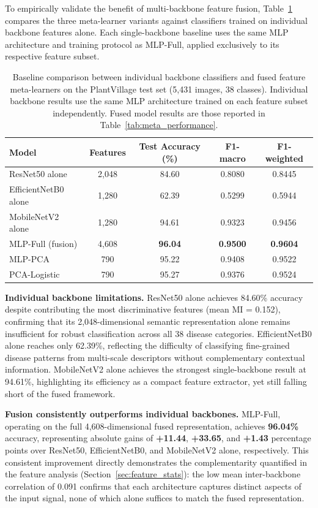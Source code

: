 \documentclass[pdflatex,sn-basic]{sn-jnl}
\begin{document}
To empirically validate the benefit of multi-backbone feature fusion,
Table~\ref{tab:baseline_comparison} compares the three meta-learner variants
against classifiers trained on individual backbone features alone. Each
single-backbone baseline uses the same MLP architecture and training protocol
as MLP-Full, applied exclusively to its respective feature subset.
\begin{table}[htbp]
\caption{Baseline comparison between individual backbone classifiers and 
fused feature meta-learners on the PlantVillage test set (5,431 images, 
38 classes). Individual backbone results use the same MLP architecture 
trained on each feature subset independently. Fused model results are 
those reported in Table~\ref{tab:meta_performance}.}
\label{tab:baseline_comparison}
\begin{tabular}{lcccc}
\toprule
Model & Features & Test Accuracy (\%) & F1-macro & F1-weighted \\
\midrule
ResNet50 alone      & 2,048 & 84.60 & 0.8080 & 0.8445 \\
EfficientNetB0 alone & 1,280 & 62.39 & 0.5299 & 0.5944 \\
MobileNetV2 alone   & 1,280 & 94.61 & 0.9323 & 0.9456 \\
\midrule
MLP-Full (fusion)   & 4,608 & \textbf{96.04} & \textbf{0.9500} & \textbf{0.9604} \\
MLP-PCA             &   790 & 95.22 & 0.9408 & 0.9522 \\
PCA-Logistic        &   790 & 95.27 & 0.9376 & 0.9524 \\
\bottomrule
\end{tabular}
\end{table}
\textbf{Individual backbone limitations.}
ResNet50 alone achieves 84.60\% accuracy despite contributing the most
discriminative features (mean MI = 0.152), confirming that its 2,048-dimensional
semantic representation alone remains insufficient for robust classification
across all 38 disease categories. EfficientNetB0 alone reaches only 62.39\%,
reflecting the difficulty of classifying fine-grained disease patterns from
multi-scale descriptors without complementary contextual information.
MobileNetV2 alone achieves the strongest single-backbone result at 94.61\%,
highlighting its efficiency as a compact feature extractor, yet still falling
short of the fused framework.

\textbf{Fusion consistently outperforms individual backbones.}
MLP-Full, operating on the full 4,608-dimensional fused representation,
achieves \textbf{96.04\%} accuracy, representing absolute gains of
\textbf{+11.44}, \textbf{+33.65}, and \textbf{+1.43} percentage points
over ResNet50, EfficientNetB0, and MobileNetV2 alone, respectively.
This consistent improvement directly demonstrates the complementarity
quantified in the feature analysis (Section~\ref{sec:feature_stats}):
the low mean inter-backbone correlation of 0.091 confirms that each
architecture captures distinct aspects of the input signal, none of
which alone suffices to match the fused representation.
\end{document}
